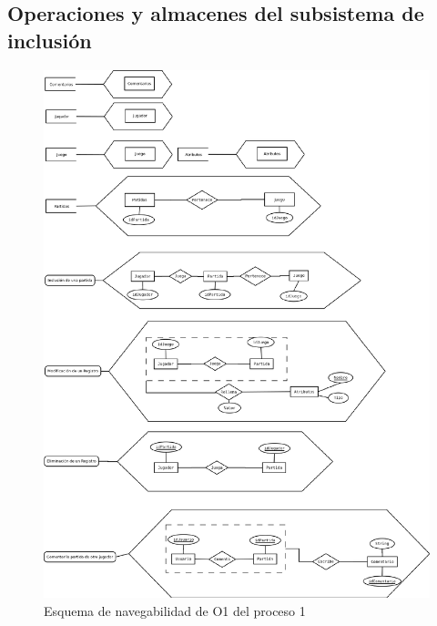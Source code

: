 \subsection{Operaciones y almacenes del subsistema de inclusión}
\begin{figure}[H]
  \centering
  \includegraphics[width=0.5\linewidth]{../Diagramas/pdf/EsquemaExternoInclusion.pdf}
  \caption{Esquema de navegabilidad de O1 del proceso 1}
\end{figure}
